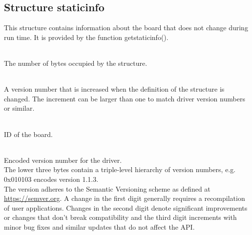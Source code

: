 

\subsection{Structure \prefix static\tu info}

This structure contains information about the board that does not change during run time. It is provided by the function \textsf{\prefix get\tu static\tu info()}.\par

\\
The number of bytes occupied by the structure.

\\
A version number that is increased when the definition of the structure is changed. The increment can be larger than one to match driver version numbers or similar.\par

\\
ID of the board.\\

\\
Encoded version number for the driver.\\
The lower three bytes contain a triple-level hierarchy of version numbers, e.g. 0x010103 encodes version 1.1.3.\\
The version adheres to the Semantic Versioning scheme as defined at \href{https://semver.org}{https://semver.org}. A change in the first digit generally requires a recompilation of user applications. 
Changes in the second digit denote significant improvements or changes that don't break compatibility 
and the third digit increments with minor bug fixes and similar updates that do not affect the API.

